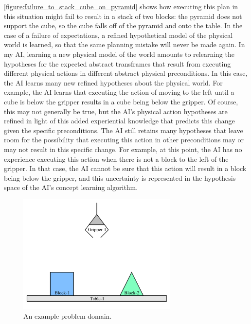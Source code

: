 {\mbox{\autoref{figure:failure_to_stack_cube_on_pyramid}}} shows how
executing this plan in this situation might fail to result in a stack
of two blocks: the pyramid does not support the cube, so the cube
falls off of the pyramid and onto the table.  In the case of a failure
of expectations, a refined hypothetical model of the physical world is
learned, so that the same planning mistake will never be made again.
In my AI, learning a new physical model of the world amounts to
relearning the hypotheses for the expected abstract transframes that
result from executing different physical actions in different abstract
physical preconditions.  In this case, the AI learns many new refined
hypotheses about the physical world.  For example, the AI learns that
executing the action of moving to the left until a cube is below the
gripper results in a cube being below the gripper.  Of course, this
may not generally be true, but the AI's physical action hypotheses are
refined in light of this added experiential knowledge that predicts
this change given the specific preconditions.  The AI still retains
many hypotheses that leave room for the possibility that executing
this action in other preconditions may or may not result in this
specific change.  For example, at this point, the AI has no experience
executing this action when there is not a block to the left of the
gripper.  In that case, the AI cannot be sure that this action will
result in a block being below the gripper, and this uncertainty is
represented in the hypothesis space of the AI's concept learning
algorithm.
\begin{figure}
\begin{center}
\includegraphics[width=8cm]{gfx/blocks_world_example-1}
\end{center}
\caption[An example problem domain.]{An example problem domain.}
\label{figure:an_example_problem_domain}
\end{figure}
